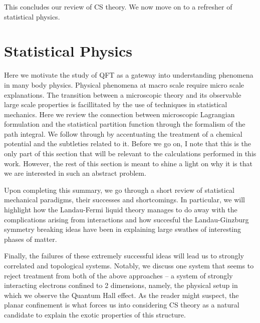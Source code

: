 This concludes our review of CS theory. We now move on to a refresher of statistical physics.


        \section{Statistical Physics}

        Here we motivate the study of QFT as a gateway into understanding phenomena in many body physics. Physical phenomena at macro scale require micro scale explanations. The transition between a microscopic theory and its observable large scale properties is facillitated by the use of techniques in statistical mechanics. Here we review the connection between microscopic Lagrangian formulation and the statistical partition function through the formalism of the path integral. We follow through by accentuating the treatment of a chemical potential and the subtleties related to it. Before we go on, I note that this is the only part of this section that will be relevant to the calculations performed in this work. However, the rest of this section is meant to shine a light on why it is that we are interested in such an abstract problem.

        Upon completing this summary, we go through a short review of statistical mechanical paradigms, their successes and shortcomings. In particular, we will highlight how the Landau-Fermi liquid theory \cite{Landau:1956zuh} manages to do away with the complications arising from interactions and how succesful the Landau-Ginzburg symmetry breaking ideas have been in explaining large swathes of interesting phases of matter. 

        Finally, the failures of these extremely successful ideas will lead us to strongly correlated and topological systems. Notably, we discuss one system that seems to reject treatment from both of the above approaches -- a system of strongly interacting electrons confined to 2 dimensions, namely, the physical setup in which we observe the Quantum Hall effect. As the reader might suspect, the planar confinement is what forces us into considering CS theory as a natural candidate to explain the exotic properties of this structure.

